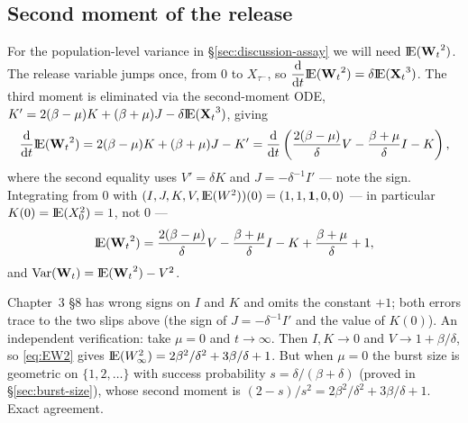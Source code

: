 \subsection{Second moment of the release}
\label{sec:EW2-sec}

For the population-level variance in \S\ref{sec:discussion-assay} we will
need ${\rm I}\!{\rm E}({{\bf W}_t}^2)$. The release variable jumps once, from $0$ to
$X_{\tau^-}$, so $\displaystyle\frac{{\rm d} }{{\rm d} t}{\rm I}\!{\rm E}({{\bf W}_t}^2)=\delta{\rm I}\!{\rm E}({{\bf X}_t}^3)$. The third moment
is eliminated via the second-moment ODE,
$K'=2(\beta-\mu)K+(\beta+\mu)J-\delta{\rm I}\!{\rm E}({{\bf X}_t}^3)$, giving
\[
\displaystyle\frac{{\rm d} }{{\rm d} t}{\rm I}\!{\rm E}({{\bf W}_t}^2)=2(\beta-\mu)K+(\beta+\mu)J-K'
=\displaystyle\frac{{\rm d} }{{\rm d} t}\left(\frac{2(\beta-\mu)}{\delta}V-\frac{\beta+\mu}{\delta}I-K\right),
\]
where the second equality uses $V'=\delta K$ and $J=-\delta^{-1}I'$ --- note
the sign. Integrating from $0$ with
$(I,J,K,V,{\rm I}\!{\rm E}(W^2))(0)=(1,1,\mathbf 1,0,0)$ --- in particular $K(0)={\rm I}\!{\rm E}(X_0^2)=1$,
not $0$ ---
\begin{equation}
{\rm I}\!{\rm E}({{\bf W}_t}^2)
=\frac{2(\beta-\mu)}{\delta}V
-\frac{\beta+\mu}{\delta}I
-K
+\frac{\beta+\mu}{\delta}
+1,
\label{eq:EW2}
\end{equation}
and $\mathrm{Var}({{\bf W}_t})={\rm I}\!{\rm E}({{\bf W}_t}^2)-V^2$.

\begin{remark}
\label{rem:EW2}
Chapter~3 \S8 has wrong signs on $I$ and $K$ and omits the constant $+1$;
both errors trace to the two slips above (the sign of $J=-\delta^{-1}I'$ and
the value of $K(0)$). An independent verification: take $\mu=0$ and
$t\to\infty$. Then $I,K\to0$ and $V\to1+\beta/\delta$, so \eqref{eq:EW2}
gives ${\rm I}\!{\rm E}(W_\infty^2)=2\beta^2/\delta^2+3\beta/\delta+1$. But when
$\mu=0$ the burst size is geometric on $\{1,2,\ldots\}$ with success
probability $s=\delta/(\beta+\delta)$ (proved in \S\ref{sec:burst-size}),
whose second moment is $(2-s)/s^2=2\beta^2/\delta^2+3\beta/\delta+1$. Exact
agreement.
\end{remark}
